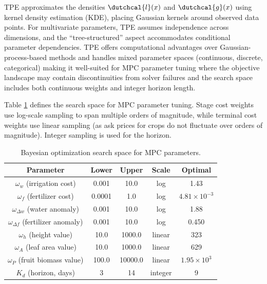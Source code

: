 \documentclass[preprint,12pt]{elsarticle}
\begin{document}
TPE approximates the densities $\dutchcal{l}(x)$ and $\dutchcal{g}(x)$ using kernel density estimation (KDE), placing Gaussian kernels around observed data points. For multivariate parameters, TPE assumes independence across dimensions, and the ``tree-structured'' aspect accommodates conditional parameter dependencies. TPE offers computational advantages over Gaussian-process-based methods and handles mixed parameter spaces (continuous, discrete, categorical) making it well-suited for MPC parameter tuning where the objective landscape may contain discontinuities from solver failures and the search space includes both continuous weights and integer horizon length.

Table \ref{tab:search-space} defines the search space for MPC parameter tuning. Stage cost weights use log-scale sampling to span multiple orders of magnitude, while terminal cost weights use linear sampling (as ask prices for crops do not fluctuate over orders of magnitude). Integer sampling is used for the horizon.

\begin{table}[ht]
\centering
\begin{tabular}{|c|c|c|c|c|}
\hline
Parameter & Lower & Upper & Scale  & Optimal \\
\hline\hline
$\omega_w$          (irrigation cost)     & 0.001  & 10.0    & log     & 1.43                  \\
$\omega_f$          (fertilizer cost)     & 0.0001 & 1.0     & log     & $4.81 \times 10^{-3}$ \\
$\omega_{\Delta w}$ (water anomaly)       & 0.001  & 10.0    & log     & 1.88                  \\
$\omega_{\Delta f}$ (fertilizer anomaly)  & 0.001  & 10.0    & log     & 0.450                 \\
$\omega_h$          (height value)        & 10.0   & 1000.0  & linear  & 323                   \\
$\omega_A$          (leaf area value)     & 10.0   & 1000.0  & linear  & 629                   \\
$\omega_P$          (fruit biomass value) & 100.0  & 10000.0 & linear  & $1.95 \times 10^{3}$  \\
$K_{d}$             (horizon, days)       & 3      & 14      & integer & 9                     \\
\hline
\end{tabular}
\caption{Bayesian optimization search space for MPC parameters.}
\label{tab:search-space}
\end{table}
\end{document}
